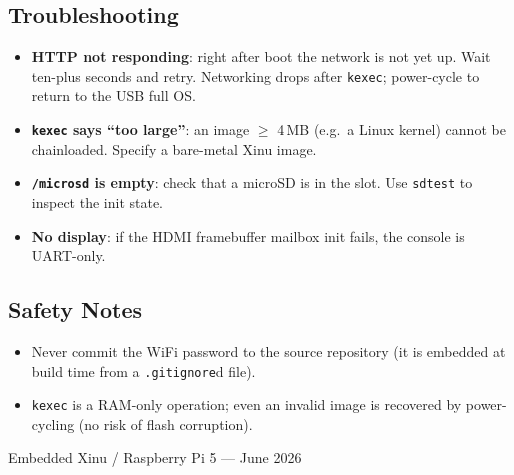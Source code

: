 \documentclass[a4paper,11pt]{article}
\begin{document}
\subsection{Troubleshooting}
\begin{itemize}[noitemsep]
  \item \textbf{HTTP not responding}: right after boot the network is not yet
        up. Wait ten-plus seconds and retry. Networking drops after
        \texttt{kexec}; power-cycle to return to the USB full OS.
  \item \textbf{\texttt{kexec} says ``too large''}: an image $\geq$ 4\,MB
        (e.g.\ a Linux kernel) cannot be chainloaded. Specify a bare-metal
        Xinu image.
  \item \textbf{\texttt{/microsd} is empty}: check that a microSD is in the
        slot. Use \texttt{sdtest} to inspect the init state.
  \item \textbf{No display}: if the HDMI framebuffer mailbox init fails, the
        console is UART-only.
\end{itemize}

\subsection{Safety Notes}
\begin{itemize}[noitemsep]
  \item Never commit the WiFi password to the source repository (it is
        embedded at build time from a \texttt{.gitignore}d file).
  \item \texttt{kexec} is a RAM-only operation; even an invalid image is
        recovered by power-cycling (no risk of flash corruption).
\end{itemize}

\vfill
\begin{center}\small Embedded Xinu / Raspberry Pi 5 --- June 2026\end{center}
\end{document}
